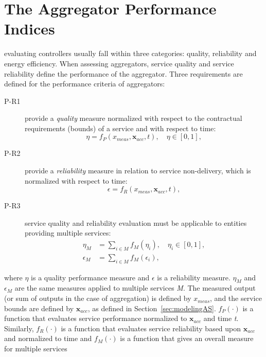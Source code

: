 \section{The Aggregator Performance Indices}
 evaluating controllers usually fall within three categories: quality, reliability and energy efficiency. When assessing aggregators, service quality and service reliability define the performance of the aggregator. Three requirements are defined for the performance criteria of aggregators:
\begin{description}
	\item[P-R1] provide a \emph{quality} measure normalized with respect to the contractual requirements (bounds) of a service and with respect to time:
		\begin{equation}
			\eta = f_P(x_{meas},\mathbf{x}_{acc},t), \quad \eta \in [0,1],
		\end{equation}
	\item[P-R2] provide a \emph{reliability} measure in relation to service non-delivery, which is normalized with respect to time:
		\begin{equation}
			\epsilon = f_R(x_{meas},\mathbf{x}_{acc},t),
		\end{equation}
	\item[P-R3] service quality and reliability evaluation must be applicable to entities providing multiple services:
		\begin{align}
			\eta_M &= \sum_{i \in M} f_M(\eta_i), \quad \eta_i \in [0,1],\\
            \epsilon_M &= \sum_{i \in M} f_M(\epsilon_i),
		\end{align}
\end{description}

where $\eta$ is a quality performance measure and $\epsilon$ is a reliability measure. $\eta_M$ and $\epsilon_M$ are the same measures applied to multiple services \emph{M}. The measured output (or sum of outputs in the case of aggregation) is defined by $x_{meas}$, and the service bounds are defined by $\mathbf{x}_{acc}$, as defined in Section~\ref{sec:modelingAS}. $f_P(\cdot)$ is a function that evaluates service performance normalized to $\mathbf{x}_{acc}$ and time \emph{t}. Similarly, $f_R(\cdot)$ is a function that evaluates service reliability based upon $\mathbf{x}_{acc}$ and normalized to time and $f_M(\cdot)$ is a function that gives an overall measure for multiple services


